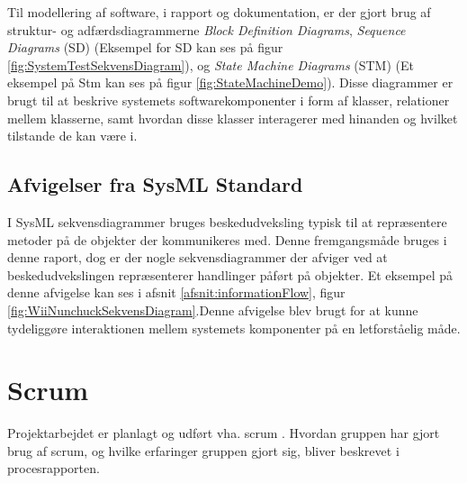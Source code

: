 \noindent Til modellering af software, i rapport og dokumentation, er der gjort brug af struktur- og adfærdsdiagrammerne \textit{Block Definition Diagrams}, \textit{Sequence Diagrams} (SD) (Eksempel for SD kan ses på figur \ref{fig:SystemTestSekvensDiagram}), og \textit{State Machine Diagrams} (STM) (Et eksempel på Stm kan ses på figur \ref{fig:StateMachineDemo}). Disse diagrammer er brugt til at beskrive systemets softwarekomponenter i form af klasser, relationer mellem klasserne, samt hvordan disse klasser interagerer med hinanden og hvilket tilstande de kan være i. 

\subsection{Afvigelser fra SysML Standard}
I SysML sekvensdiagrammer bruges beskedudveksling typisk til at repræsentere metoder på de objekter der kommunikeres med. Denne fremgangsmåde bruges i denne raport, dog er der nogle sekvensdiagrammer der afviger ved at beskedudvekslingen repræsenterer handlinger påført på objekter. Et eksempel på denne afvigelse kan ses i afsnit \ref{afsnit:informationFlow}, figur \ref{fig:WiiNunchuckSekvensDiagram}.Denne afvigelse blev brugt for at kunne tydeliggøre interaktionen mellem systemets komponenter på en letforståelig måde.

\section{Scrum}
Projektarbejdet er planlagt og udført vha. scrum \cite{scrum}. Hvordan gruppen har gjort brug af scrum, og hvilke erfaringer gruppen gjort sig, bliver beskrevet i procesrapporten.